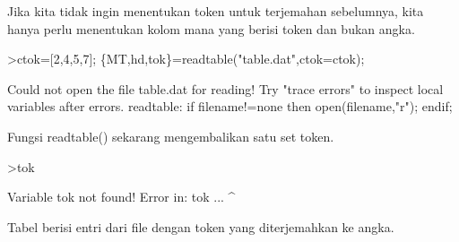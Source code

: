 \documentclass[a4paper,10pt]{article}
\begin{document}
\begin{eulernotebook}
\begin{eulercomment}
\begin{eulercomment}
\begin{eulercomment}
\begin{eulercomment}
\begin{eulercomment}
\begin{eulercomment}
\begin{eulercomment}
\begin{eulercomment}
\begin{eulercomment}
\begin{eulercomment}
\begin{eulercomment}
\begin{eulercomment}
\begin{eulercomment}
\begin{eulercomment}
\begin{eulercomment}
\begin{eulercomment}
\begin{eulercomment}
\begin{eulercomment}
\begin{eulercomment}
Jika kita tidak ingin menentukan token untuk terjemahan sebelumnya,
kita hanya perlu menentukan kolom mana yang berisi token dan bukan
angka.
\end{eulercomment}
\begin{eulerprompt}
>ctok=[2,4,5,7]; \{MT,hd,tok\}=readtable("table.dat",ctok=ctok);
\end{eulerprompt}
\begin{euleroutput}
  Could not open the file
  table.dat
  for reading!
  Try "trace errors" to inspect local variables after errors.
  readtable:
      if filename!=none then open(filename,"r"); endif;
\end{euleroutput}
\begin{eulercomment}
Fungsi readtable() sekarang mengembalikan satu set token.
\end{eulercomment}
\begin{eulerprompt}
>tok
\end{eulerprompt}
\begin{euleroutput}
  Variable tok not found!
  Error in:
  tok ...
     ^
\end{euleroutput}
\begin{eulercomment}
Tabel berisi entri dari file dengan token yang diterjemahkan ke angka.


\end{eulercomment}
\end{eulercomment}
\end{eulercomment}
\end{eulercomment}
\end{eulercomment}
\end{eulercomment}
\end{eulercomment}
\end{eulercomment}
\end{eulercomment}
\end{eulercomment}
\end{eulercomment}
\end{eulercomment}
\end{eulercomment}
\end{eulercomment}
\end{eulercomment}
\end{eulercomment}
\end{eulercomment}
\end{eulercomment}
\end{eulercomment}
\end{eulernotebook}
\end{document}
